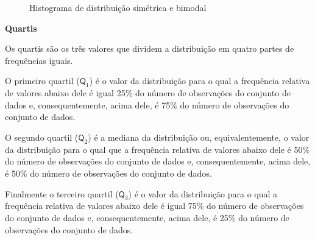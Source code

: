 \begin{figure}[H]
\centering
\capstart

\caption{Histograma de distribuição simétrica e bimodal}\label{\detokenize{PE104-1:id5}}\label{\detokenize{PE104-1:id20}}\end{figure}

\textbf{Quartis}

Os quartis são os três valores que dividem a distribuição em quatro partes de frequências iguais.

O primeiro quartil (\(\textsf{Q}_1\)) é o valor da distribuição para o qual a frequência relativa de valores abaixo dele é igual 25\% do número de observações do conjunto de dados e, consequentemente, acima dele, é 75\% do número de observações do conjunto de dados.

O segundo quartil (\(\textsf{Q}_2\)) é a mediana da distribuição ou, equivalentemente, o  valor da distribuição para o qual que a frequência relativa de valores abaixo dele é 50\% do número de observações do conjunto de dados e, consequentemente, acima dele, é 50\% do número de observações do conjunto de dados.

Finalmente o terceiro quartil (\(\textsf{Q}_3\)) é o valor da distribuição
para o qual a frequência relativa de valores abaixo dele é igual 75\% do número de observações do conjunto de dados e, consequentemente, acima dele, é 25\% do número de observações do conjunto de dados.

